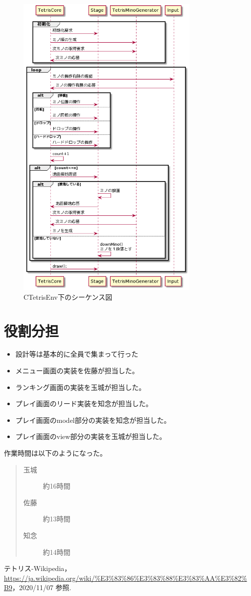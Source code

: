 \documentclass[a4paper,11pt]{jsarticle}
\begin{document}
\begin{figure}[htbp]
\begin{center}
\includegraphics[width=0.8\textwidth]{sequence.png}
\caption{CTetrisEnv下のシーケンス図}
\label{sequence}
\end{center}
\end{figure}
\clearpage

\section{役割分担}
\begin{itemize}
  \item 設計等は基本的に全員で集まって行った
  \item メニュー画面の実装を佐藤が担当した。
  \item ランキング画面の実装を玉城が担当した。
  \item プレイ画面のリード実装を知念が担当した。
  \item プレイ画面のmodel部分の実装を知念が担当した。
  \item プレイ画面のview部分の実装を玉城が担当した。
\end{itemize}
作業時間は以下のようになった。
\begin{quote}
\begin{description}
\item[玉城] 約16時間
\item[佐藤] 約13時間
\item[知念] 約14時間
\end{description}
\end{quote}

\begin{thebibliography}{99}
   テトリス-Wikipedia，\url{https://ja.wikipedia.org/wiki/%E3%83%86%E3%83%88%E3%83%AA%E3%82%B9}，2020/11/07 参照.
\end{thebibliography}
\end{document}
